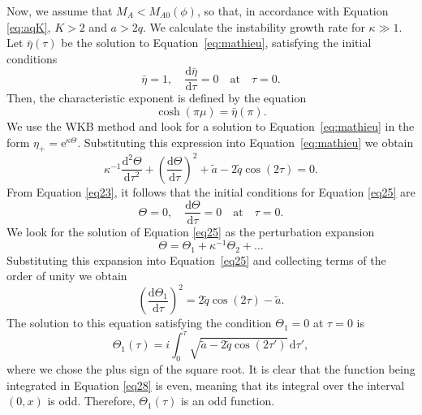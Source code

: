Now, we assume that $M_A < M_{A0}(\phi)$, so that, in accordance with Equation \eqref{eq:aqK}, $K > 2$ and $a > 2q$.
We calculate the instability growth rate for $\kappa \gg 1$.
Let $\bar\eta(\tau)$ be the solution to Equation~\eqref{eq:mathieu}, satisfying the initial conditions
%
\begin{equation}
\label{eq23}
\bar\eta = 1, \quad \frac{\mathrm{d}\bar\eta}{\mathrm{d}\tau} = 0 \quad
\mbox{at} \quad \tau = 0. 
\end{equation}
%
Then, the characteristic exponent is defined by the equation \citep{Abramowitz1965}
%
\begin{equation}
\label{eq24}
\cosh(\pi\mu) = \bar\eta(\pi).
\end{equation}
%
We use the WKB method and look for a solution to Equation~\eqref{eq:mathieu} in the form  $\eta_+ = \mathrm{e}^{\kappa\Theta}$\/. Substituting this expression into Equation~\eqref{eq:mathieu} we obtain
%
\begin{equation}
\label{eq25}
\kappa^{-1}\frac{\mathrm{d}^2\Theta}{\mathrm{d}\tau^2} + 
\left(\frac{\mathrm{d}\Theta}{\mathrm{d}\tau}\right)^2 +
\tilde{a} - 2\tilde{q}\cos(2\tau) = 0. 
\end{equation}
%
From Equation \eqref{eq23}, it follows that the initial conditions for Equation \eqref{eq25} are
%
\begin{equation}
\Theta = 0, \quad \frac{\mathrm{d} \Theta}{\mathrm{d}\tau} = 0 \quad
\mbox{at} \quad \tau = 0.
\end{equation}
%
We look for the solution of Equation \eqref{eq25} as the perturbation expansion
\begin{equation}
\label{eq26}
\Theta = \Theta_1 + \kappa^{-1}\Theta_2 + \dots 
\end{equation}
%
Substituting this expansion into Equation~\eqref{eq25} and collecting terms of the order of unity we obtain
%
\begin{equation}
\label{eq27}
\left(\frac{\mathrm{d}\Theta_1}{\mathrm{d}\tau}\right)^2 =
2\tilde{q}\cos(2\tau) - \tilde{a}. 
\end{equation}
%
The solution to this equation satisfying the condition $\Theta_1 = 0$ at $\tau = 0$ is
%
\begin{equation}
\label{eq28}
\Theta_1 (\tau) = i\int_0^\tau\sqrt{\tilde{a} - 2\tilde{q}\cos(2\tau')}\,\mathrm{d}\tau',
\end{equation}
%
where we chose the plus sign of the square root.
It is clear that the function being integrated in Equation \eqref{eq28} is even, meaning that its integral over the interval $(0, x)$ is odd.
Therefore, $\Theta_1 (\tau)$ is an odd function.

